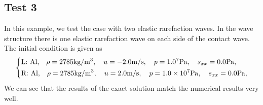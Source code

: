 \documentclass[review]{elsarticle}
\numberwithin{equation}{section}
\numberwithin{table}{section}
\begin{document}
\subsection{Test 3}
In this example, we test the case with two elastic rarefaction waves. In the wave structure there is one elastic rarefaction wave on each side of the contact wave. The initial condition is given as
\begin{equation}
 \left\{ \begin{aligned}
	 &	 \text{L: Al,}\quad  \rho = 2785 \text{kg}/\text{m}^3, \quad  u = -2.0\text{m}/\text{s}, \quad  p = 1.0\time 10^7\text{Pa}, \quad  s_{xx}=0.0 \text{Pa},\\
	 &	 \text{R: Al,}\quad  \rho = 2785 \text{kg}/\text{m}^3, \quad  u = 2.0\text{m}/\text{s}, \quad  p = 1.0\times 10^7 \text{Pa}, \quad  s_{xx}=0.0 \text{Pa},\\
   \end{aligned}
 \right.
\end{equation}
We can see that the results of the exact solution match the numerical results very well.
%
\end{document}
